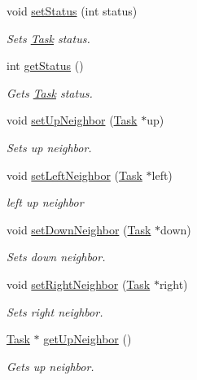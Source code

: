 \begin{DoxyCompactItemize}
void \hyperlink{classTask_a8fa9bb1e2d51ce78d1d4644b421f4f9d}{set\+Status} (int status)
\begin{DoxyCompactList}\small\item\em Sets \hyperlink{classTask}{Task} status. \end{DoxyCompactList}\item 
int \hyperlink{classTask_a7b3e05f3ebf0b3d5c4ae65787d7df64b}{get\+Status} ()\hypertarget{classTask_a7b3e05f3ebf0b3d5c4ae65787d7df64b}{}\label{classTask_a7b3e05f3ebf0b3d5c4ae65787d7df64b}

\begin{DoxyCompactList}\small\item\em Gets \hyperlink{classTask}{Task} status. \end{DoxyCompactList}\item 
void \hyperlink{classTask_a3fc6de2fea3bd4869ca72c3b2865aec9}{set\+Up\+Neighbor} (\hyperlink{classTask}{Task} $\ast$up)
\begin{DoxyCompactList}\small\item\em Sets up neighbor. \end{DoxyCompactList}\item 
void \hyperlink{classTask_a6bd437a671ffc49d1b3a8cb1bec26029}{set\+Left\+Neighbor} (\hyperlink{classTask}{Task} $\ast$left)
\begin{DoxyCompactList}\small\item\em left up neighbor \end{DoxyCompactList}\item 
void \hyperlink{classTask_a37b2f9e5a854fd3f863c2456d6ddaf9d}{set\+Down\+Neighbor} (\hyperlink{classTask}{Task} $\ast$down)
\begin{DoxyCompactList}\small\item\em Sets down neighbor. \end{DoxyCompactList}\item 
void \hyperlink{classTask_a2cfffab3231663e550459c7adf071adb}{set\+Right\+Neighbor} (\hyperlink{classTask}{Task} $\ast$right)
\begin{DoxyCompactList}\small\item\em Sets right neighbor. \end{DoxyCompactList}\item 
\hyperlink{classTask}{Task} $\ast$ \hyperlink{classTask_a1bd132471a3df6a117e741b9d5a1cee9}{get\+Up\+Neighbor} ()
\begin{DoxyCompactList}\small\item\em Gets up neighbor. \end{DoxyCompactList}\item 

\end{DoxyCompactItemize}

